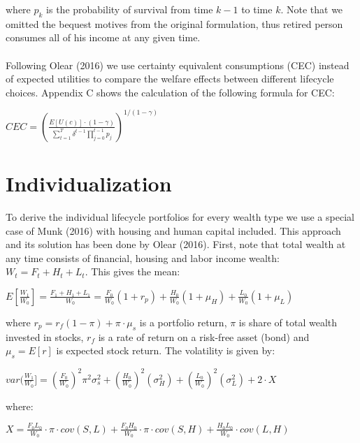 where $p_k$ is the probability of survival from time $k-1$ to time $k$. Note that we omitted the bequest motives from the original formulation, thus retired person consumes all of his income at any given time.

\paragraph*{}Following Olear (2016) we use certainty equivalent consumptions (CEC) instead of expected utilities to compare the welfare effects between different lifecycle choices. Appendix C shows the calculation of the following formula for CEC:

\begin{center}
	$CEC = \left( \frac{E[U(c)]\cdot(1-\gamma)}{\sum^T_{t=1} \delta^{t-1} \prod^{t-1}_{j=0} p_j} \right)^{1/(1-\gamma)}$
\end{center}


\section{Individualization}

To derive the individual lifecycle portfolios for every wealth type we use a special case of Munk (2016) with housing and human capital included. This approach and its solution has been done by Olear (2016). First, note that total wealth at any time consists of financial, housing and labor income wealth: $W_t = F_t + H_t + L_t$. This gives the mean:

\begin{center}
	$E[\frac{W_1}{W_0}] = \frac{F_1 + H_1 + L_1}{W_0} =  \frac{F_0}{W_0} (1 + r_p) + \frac{H_0}{W_0}(1+\mu_H) + \frac{L_0}{W_0}(1+\mu_L)$
\end{center}

where $r_p = r_f(1-\pi) + \pi \cdot \mu_s$ is a portfolio return, $\pi$ is share of total wealth invested in stocks, $r_f$ is a rate of return on a risk-free asset (bond) and $\mu_s = E[r]$ is expected stock return. The volatility is given by:

\begin{center}
	$var(\frac{W_1}{W_0}] = (\frac{F_0}{W_0})^2 \pi^2 \sigma^2_s + (\frac{H_0}{W_0})^2(\sigma^2_H) + (\frac{L_0}{W_0})^2(\sigma^2_L) + 2 \cdot X$
\end{center}

where:

\begin{center}
	$X = \frac{F_0 L_0}{W_0} \cdot \pi\cdot cov(S,L) + \frac{F_0 H_0}{W_0} \cdot \pi\cdot cov(S,H) + \frac{H_0 L_0}{W_0} \cdot cov(L,H)$
\end{center}


